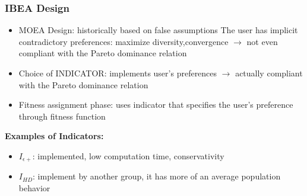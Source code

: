 \documentclass[10pt]{beamer}
\newcommand{\bi}{\begin{itemize}}
\newcommand{\ei}{\end{itemize}}
\begin{document}
 \begin{frame}
 \frametitle{IBEA Design}
    \bi
    \item MOEA Design: historically based on false assumptions
	The user has implicit contradictory preferences: maximize {diversity,convergence}
		$\rightarrow$ not even compliant with the Pareto dominance relation
		
	\item Choice of INDICATOR: implements user's preferences
	 $\rightarrow$ actually compliant with the Pareto dominance relation
	\item Fitness assignment phase: uses indicator that specifies the user's preference through fitness function
	\ei

	\textbf{Examples of Indicators:}
	\bi
		\item $I_{\epsilon +}$: implemented, low computation time, conservativity
		
		\item $I_{HD}$: implement by another group, it has more of an average population behavior
	\ei
 
  \end{frame}  
  
%
%    
%   
%    
  
\end{document}

